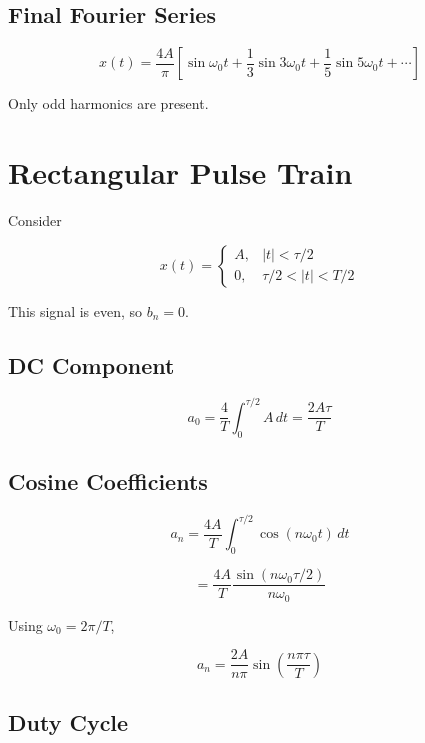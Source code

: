 \subsection{Final Fourier Series}

\[
\boxed{
x(t)=
\frac{4A}{\pi}
\left[
\sin\omega_0 t
+\frac{1}{3}\sin3\omega_0 t
+\frac{1}{5}\sin5\omega_0 t
+\cdots
\right]
}
\]

Only odd harmonics are present.


\section{Rectangular Pulse Train}

Consider

\[
x(t)=
\begin{cases}
A, & |t|<\tau/2\\
0, & \tau/2<|t|<T/2
\end{cases}
\]

This signal is even, so \(b_n=0\).


\subsection{DC Component}

\[
a_0=
\frac{4}{T}
\int_0^{\tau/2}A\,dt
=
\frac{2A\tau}{T}
\]


\subsection{Cosine Coefficients}

\[
a_n=
\frac{4A}{T}
\int_0^{\tau/2}
\cos(n\omega_0 t)\,dt
\]

\[
=
\frac{4A}{T}
\frac{\sin(n\omega_0\tau/2)}{n\omega_0}
\]

Using \(\omega_0=2\pi/T\),

\[
\boxed{
a_n=
\frac{2A}{n\pi}
\sin\left(\frac{n\pi\tau}{T}\right)
}
\]


\subsection{Duty Cycle}

